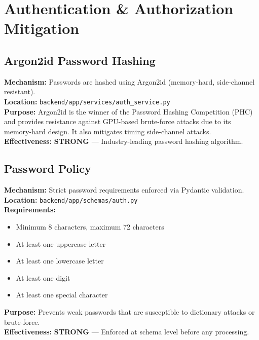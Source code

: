 \documentclass[11pt,a4paper]{article}
\begin{document}
\section{Authentication \& Authorization Mitigation}

\subsection{Argon2id Password Hashing}

\begin{tcolorbox}[colback=shieldgreen!5, colframe=shieldgreen]
\textbf{Mechanism:} Passwords are hashed using Argon2id (memory-hard, side-channel resistant).\\
\textbf{Location:} \texttt{backend/app/services/auth\_service.py}\\
\textbf{Purpose:} Argon2id is the winner of the Password Hashing Competition (PHC) and provides resistance against GPU-based brute-force attacks due to its memory-hard design. It also mitigates timing side-channel attacks.\\
\textbf{Effectiveness:} \textcolor{shieldgreen}{\textbf{STRONG}} — Industry-leading password hashing algorithm.
\end{tcolorbox}

\subsection{Password Policy}

\begin{tcolorbox}[colback=shieldgreen!5, colframe=shieldgreen]
\textbf{Mechanism:} Strict password requirements enforced via Pydantic validation.\\
\textbf{Location:} \texttt{backend/app/schemas/auth.py}\\
\textbf{Requirements:}
\begin{itemize}[nosep]
  \item Minimum 8 characters, maximum 72 characters
  \item At least one uppercase letter
  \item At least one lowercase letter
  \item At least one digit
  \item At least one special character
\end{itemize}
\textbf{Purpose:} Prevents weak passwords that are susceptible to dictionary attacks or brute-force.\\
\textbf{Effectiveness:} \textcolor{shieldgreen}{\textbf{STRONG}} — Enforced at schema level before any processing.
\end{tcolorbox}
\end{document}
